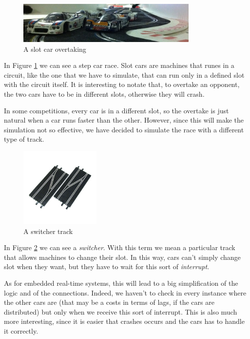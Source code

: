 \begin{figure}[H]
\centering %
\includegraphics[width=0.8\textwidth]{./img/overtaking.jpg}
\caption{A slot car overtaking}
\label{fig:overtaking}
\end{figure}

In Figure \ref{fig:overtaking} we can see a step car race. Slot cars are machines that runes in a circuit, like the one that we have to simulate, that can run only in a defined slot with the circuit itself. It is interesting to notate that, to overtake an opponent, the two cars have to be in different slots, otherwise they will crash.

In some competitions, every car is in a different slot, so the overtake is just natural when a car runs faster than the other. However, since this will make the simulation not so effective, we have decided to simulate the race with a different type of track.

\begin{figure}[H]
\centering %
\includegraphics[width=150px]{./img/switcher.jpg}
\caption{A switcher track}
\label{fig:switcher}
\end{figure}

In Figure \ref{fig:switcher} we can see a \textit{switcher}. With this term we mean a particular track that allows machines to change their slot. In this way, cars can't simply change slot when they want, but they have to wait for this sort of \textit{interrupt}. 

As for embedded real-time systems, this will lead to a big simplification of the logic and of the connections. Indeed, we haven't to check in every instance where the other cars are (that may be a costs in terms of lags, if the cars are distributed) but only when we receive this sort of interrupt. This is also much more interesting, since it is easier that crashes occurs and the cars has to handle it correctly.

